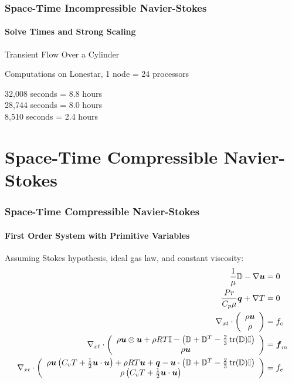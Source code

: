 \documentclass[18pt,xcolor=table]{beamer}
\begin{document}
\begin{frame}
\frametitle{Space-Time Incompressible Navier-Stokes}
\framesubtitle{Solve Times and Strong Scaling}  %
\begin{block}{Transient Flow Over a Cylinder}
\end{block}
Computations on Lonestar, 1 node = 24 processors

32,008 seconds = 8.8 hours\\ 28,744 seconds = 8.0 hours\\ \hspace{1ex}8,510 seconds = 2.4 hours
\end{frame}



\section{Space-Time Compressible Navier-Stokes}
\begin{frame}[t]
\frametitle{Space-Time Compressible Navier-Stokes}
\framesubtitle{First Order System with Primitive Variables}
Assuming Stokes hypothesis, ideal gas law, and constant viscosity:
\begin{align*}
  \frac{1}{\mu}\mathbb{D}-\nabla\boldsymbol u&=0\\
  \frac{Pr}{C_p\mu}\boldsymbol q+\nabla T&=0\\
  \nabla_{xt}\cdot\left( \begin{array}{c} \rho\boldsymbol u\\ \rho\\ \end{array} \right)&=f_c\\
  \nabla_{xt}\cdot\left( \begin{array}{c} \rho\boldsymbol u\otimes\boldsymbol u+\rho RT\mathbb{I}-\left( \mathbb{D}+\mathbb{D}^T-\frac{2}{3}\operatorname*{tr}(\mathbb{D})\mathbb{I} \right)\\ \rho\boldsymbol u\\ \end{array} \right)&=\boldsymbol f_m\\
  \nabla_{xt}\cdot\left( \begin{array}{c} \rho\boldsymbol u\left( C_v T+\frac{1}{2}\boldsymbol u\cdot\boldsymbol u \right)+\rho RT\boldsymbol u+\boldsymbol q-\boldsymbol u\cdot\left( \mathbb{D}+\mathbb{D}^T-\frac{2}{3}\operatorname*{tr}(\mathbb{D})\mathbb{I} \right)\\ \rho\left( C_v T+\frac{1}{2}\boldsymbol u\cdot\boldsymbol u \right)\\ \end{array} \right)&=f_e
\end{align*}
\end{frame}
\end{document}

